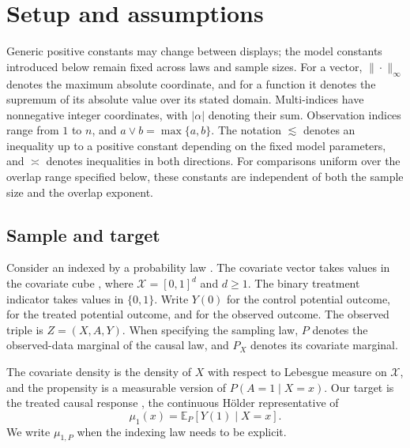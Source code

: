 \documentclass[11pt]{article}
\begin{document}
\section{Setup and assumptions}

Generic positive constants may change between displays; the model constants introduced below remain fixed across laws and sample sizes. For a vector, \(\|\cdot\|_\infty\) denotes the maximum absolute coordinate, and for a function it denotes the supremum of its absolute value over its stated domain. Multi-indices have nonnegative integer coordinates, with \(|\alpha|\) denoting their sum. Observation indices range from \(1\) to \(n\), and \(a\vee b=\max\{a,b\}\). The notation \(\lesssim\) denotes an inequality up to a positive constant depending on the fixed model parameters, and \(\asymp\) denotes inequalities in both directions. For comparisons uniform over the overlap range specified below, these constants are independent of both the sample size and the overlap exponent.

\subsection{Sample and target}

Consider an  indexed by a probability law . The covariate vector  takes values in the covariate cube , where \(\mathcal X=[0,1]^d\) and \(d\ge1\). The binary treatment indicator  takes values in \(\{0,1\}\). Write \(Y(0)\) for the control potential outcome,  for the treated potential outcome, and  for the observed outcome. The observed triple  is \(Z=(X,A,Y)\). When specifying the sampling law, \(P\) denotes the observed-data marginal of the causal law, and \(P_X\) denotes its covariate marginal.

The covariate density  is the density of \(X\) with respect to Lebesgue measure on \(\mathcal X\), and the propensity  is a measurable version of \(P(A=1\mid X=x)\). Our target is the treated causal response , the continuous Hölder representative of
\[
\mu_1(x)=\mathbb E_P[Y(1)\mid X=x].
\]
We write \(\mu_{1,P}\) when the indexing law needs to be explicit.
\end{document}
